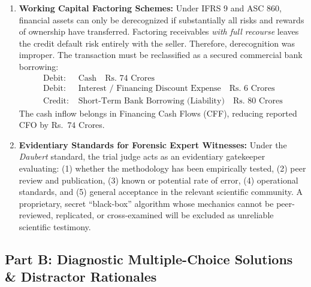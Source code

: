 \begin{enumerate}[label=\textbf{P3.\arabic*}]
    \item \textbf{Working Capital Factoring Schemes:}
    Under IFRS 9 and ASC 860, financial assets can only be derecognized if substantially all risks and rewards of ownership have transferred. Factoring receivables \textit{with full recourse} leaves the credit default risk entirely with the seller. Therefore, derecognition was improper. The transaction must be reclassified as a secured commercial bank borrowing:
    \begin{align*}
    \text{Debit: } & \text{Cash} \quad \text{Rs.~} 74\text{ Crores} \\
    \text{Debit: } & \text{Interest / Financing Discount Expense} \quad \text{Rs.~} 6\text{ Crores} \\
    \text{Credit: } & \text{Short-Term Bank Borrowing (Liability)} \quad \text{Rs.~} 80\text{ Crores}
    \end{align*}
    The cash inflow belongs in Financing Cash Flows (CFF), reducing reported CFO by Rs.~$74$ Crores.

    \item \textbf{Evidentiary Standards for Forensic Expert Witnesses:}
    Under the \textit{Daubert} standard, the trial judge acts as an evidentiary gatekeeper evaluating: (1) whether the methodology has been empirically tested, (2) peer review and publication, (3) known or potential rate of error, (4) operational standards, and (5) general acceptance in the relevant scientific community. A proprietary, secret ``black-box'' algorithm whose mechanics cannot be peer-reviewed, replicated, or cross-examined will be excluded as unreliable scientific testimony.
\end{enumerate}

\subsection*{Part B: Diagnostic Multiple-Choice Solutions \& Distractor Rationales}

